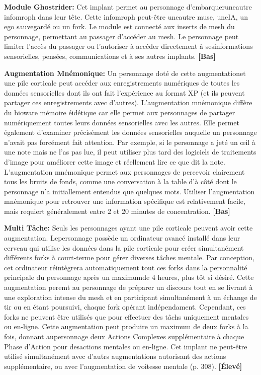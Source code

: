 \textbf{Module Ghostrider:} Cet implant permet au personnage d'embarqueruneautre infomroph dans leur tête. Cette infomroph peut-être uneautre muse, uneIA, un ego sauvegardé ou un fork. Le module est connecté aux inserts de mesh du personnage, permettant au passager d'accéder au mesh. Le personnage peut limiter l'accès du passager ou l'autoriser à accéder directement à sesinformations sensorielles, pensées, communications et à ses autres implants. \textbf{[Bas]} 

\textbf{Augmentation Mnémonique:} Un personnage doté de cette augmentationet une pile corticale peut accéder aux enregistrements numériques de toutes les données sensorielles dont ils ont fait l'expérience au format XP (et ils peuvent partager ces enregistrements avec d'autres). L'augmentation mnémonique diffère du bioware mémoire éidétique car elle permet aux personnages de partager numériquement toutes leurs données sensorielles avec les autres. Elle permet également d'examiner précisément les données sensorielles auquelle un personnage n'avait pas forcément fait attention. Par exemple, si le personnage a jeté un œil à une note mais ne l'as pas lue, il peut utiliser plus tard des logiciels de traitements d'image pour améliorer cette image et réellement lire ce que dit la note. L'augmentation mnémonique permet aux personnages de percevoir clairement tous les bruits de fonds, comme une conversation à la table d'à côté dont le personnage n'a initiallement entendus que quelques mots. Utiliser l'augmentation mnémonique pour retrouver une information spécifique est relativement facile, mais requiert généralement entre 2 et 20 minutes de concentration. \textbf{[Bas]} 

\textbf{Multi Tâche:} Seuls les personnages ayant une pile corticale peuvent avoir cette augmentation. Lepersonnage possède un ordinateur avancé installé dans leur cerveau qui utilise les données dans la pile corticale pour créer simultanément différents forks à court-terme pour gérer diverses tâches mentale. Par conception, cet ordinateur réintègrera automatiquement tout ces forks dans la personnalité principale du personnage après un maximumde 4 heures, plus tôt si désiré. Cette augmentation peremt au personnage de préparer un discours tout en se livrant à une exploration intense du mesh et en participant simultanément à un échange de tir ou en étant poursuivi, chaque fork opérant indépendament. Cependant, ces forks ne peuvent être utilisés que pour effectuer des tâchs uniquement mentales ou en-ligne. Cette augmentation peut produire un maximum de deux forks à la fois, donnant aupersonnage deux Actions Complexes supplémentaire à chaque Phase d'Action pour desactions mentales ou en-ligne. Cet implant ne peut-être utilisé simultanément avec d'autrs augmentations autorisant des actions supplémentaire, ou avec l'augmentation de voitesse mentale (p. 308). \textbf{[Élevé]} 

